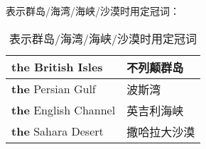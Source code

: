 \documentclass[UTF8]{ctexart}
\begin{document}
    表示群岛/海湾/海峡/沙漠时用定冠词：
    \begin{table}[h!]
        \begin{center}
            \ttfamily
            \begin{tabular}{p{180pt}|p{100pt}}
                \hline
                \textbf{the} British Isles&不列颠群岛\\ \hline
                \textbf{the} Persian Gulf&波斯湾\\ \hline
                \textbf{the} English Channel&英吉利海峡\\ \hline
                \textbf{the} Sahara Desert&撒哈拉大沙漠\\ \hline
            \end{tabular}
            \rmfamily
            \caption{表示群岛/海湾/海峡/沙漠时用定冠词}
        \end{center}
    \end{table}\\
\end{document}
